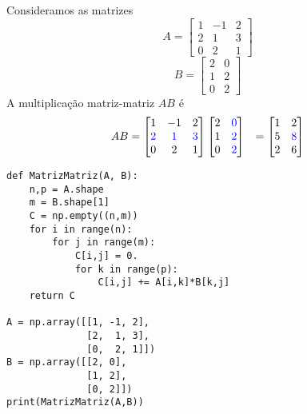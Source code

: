 \begin{ex}
  Consideramos as matrizes
  \begin{equation}
    A =
    \begin{bmatrix}
      1 & -1 & 2\\
      2 & 1 & 3\\
      0 & 2 & 1
    \end{bmatrix}
  \end{equation}
  \begin{equation}
    B =
    \begin{bmatrix}
      2 & 0\\
      1 & 2\\
      0 & 2
    \end{bmatrix}
  \end{equation}
  A multiplicação matriz-matriz $AB$ é
  \begin{subequations}
    \begin{align}
      AB &= \begin{bmatrix}
      1 & -1 & 2\\
      \color{blue}2 & \color{blue}1 & \color{blue}3\\
      0 & 2 & 1
    \end{bmatrix}\begin{bmatrix}
      2 & \color{blue}0\\
      1 & \color{blue}2\\
      0 & \color{blue}2
    \end{bmatrix}
        &=
          \begin{bmatrix}
            1 & 2\\
            5 & \color{blue}8\\
            2 & 6
          \end{bmatrix}
    \end{align}
  \end{subequations}

\begin{lstlisting}
def MatrizMatriz(A, B):
    n,p = A.shape
    m = B.shape[1]
    C = np.empty((n,m))
    for i in range(n):
        for j in range(m):
            C[i,j] = 0.
            for k in range(p):
                C[i,j] += A[i,k]*B[k,j]
    return C

A = np.array([[1, -1, 2],
              [2,  1, 3],
              [0,  2, 1]])
B = np.array([[2, 0],
              [1, 2],
              [0, 2]])
print(MatrizMatriz(A,B))
\end{lstlisting}

\end{ex}

